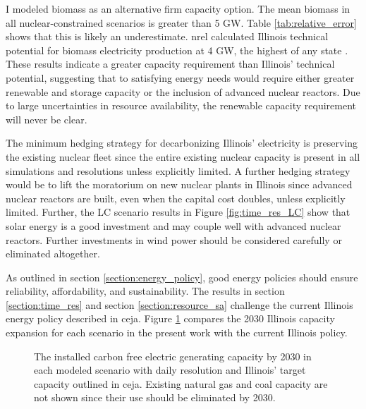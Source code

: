 I modeled biomass as an alternative firm capacity option. The mean biomass in all
nuclear-constrained scenarios is greater than 5 GW. Table \ref{tab:relative_error}
shows that this is likely an underestimate. \gls{nrel} calculated Illinois technical
potential for biomass electricity production at 4 GW, the highest of any state
\cite{lopez_us_2012}. These results indicate a greater capacity requirement than
Illinois' technical potential, suggesting that to satisfying energy needs would
require either greater renewable and storage capacity or the inclusion of advanced
nuclear reactors. Due to large uncertainties in resource availability, the renewable
capacity requirement will never be clear.

The minimum hedging strategy for decarbonizing Illinois' electricity is preserving
the existing nuclear fleet since the entire existing nuclear capacity is present
in all simulations and resolutions unless explicitly limited. A further
hedging strategy would be to lift the moratorium on new nuclear plants in Illinois
since advanced nuclear reactors are built, even when the capital cost doubles, unless
explicitly limited. Further, the \gls{LC} scenario results in Figure \ref{fig:time_res_LC}
show that solar energy is a good investment and may couple well
with advanced nuclear reactors. Further investments in wind power should be
considered carefully or eliminated altogether.

As outlined in section \ref{section:energy_policy}, good energy policies should
ensure reliability, affordability, and sustainability. The results in section
\ref{section:time_res} and section \ref{section:resource_sa} challenge the
current Illinois energy policy described in \gls{ceja}. Figure \ref{fig:compare_ceja}
compares the 2030 Illinois capacity expansion for each scenario in the present
work with the current Illinois policy.

\begin{figure}[H]
  \centering
  \resizebox{0.85\columnwidth}{!}{}
  \caption{The installed carbon free electric generating capacity by 2030 in
  each modeled scenario with daily resolution and Illinois' target capacity outlined
  in \gls{ceja}. Existing natural gas and coal capacity are not shown since their
  use should be eliminated by 2030.}
  \label{fig:compare_ceja}
\end{figure}

